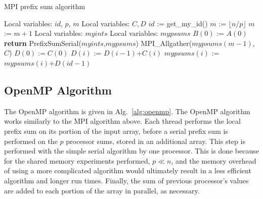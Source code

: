 \documentclass[12pt]{article}
\renewcommand{\SS}{\State}
\begin{document}
\begin{algorithm}
{{\begin{algorithm}
\begin{algorithmic}
    \caption{MPI prefix sum algorithm\label{alg:mpi}}
 
    \State {}
    \State Local variables: $id$, $p$, $m$ 
    \State Local variables: $C,D$ 
    \State $id$ := get\_my\_id() 
    \State $m$ := $\lfloor n/p \rfloor$ 
    \State $m$ :=  $m+1$
    \EndIf
    \State Local variables: $myints$ 
    \State Local variables: $mypsums$ 
        \SS $B(0)$ := $A(0)$
        \SS \textbf{return}
    \Else
        \SS PrefixSumSerial($myints$,$mypsums$)
    \EndIf
    \State MPI\_Allgather($mypsums(m-1)$,$C$) 
    $D(0) := C(0)$
     
        \State $D(i)$ := $D(i-1)$+$C(i)$
    \EndFor
            \SS $mypsums(i)$ := $mypsums(i)$+$D(id-1)$
        \EndFor
    \EndIf {}
\EndProcedure
\end{algorithmic}
\end{algorithm}

\subsection{OpenMP Algorithm}

The OpenMP algorithm is given in Alg.~\ref{alg:openmp}.  The OpenMP algorithm works similarly to the MPI algorithm above.  Each thread performs the
local prefix sum on its portion of the input array, before a serial prefix sum is
performed on the $p$ processor sums, stored in an additional array.  This step is performed
with the simple serial algorithm by one processor.  This is done because for the
shared memory experiments performed, $p\ll n$, and the memory overhead of using a more
complicated algorithm would ultimately result in a less efficient algorithm and
longer run times.  Finally, the sum of previous processor's values are added
to each portion of the array in parallel, as necessary.  

}}
\end{algorithm}
\end{document}
